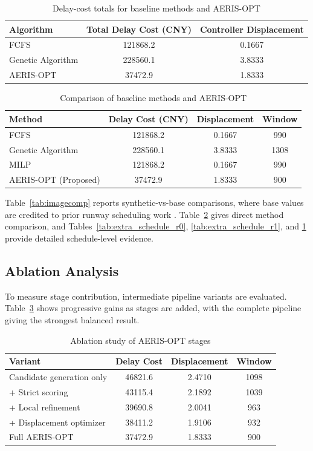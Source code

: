 \documentclass[conference]{IEEEtran}
\begin{document}
\begin{table}[t]
\centering
\caption{Delay-cost totals for baseline methods and AERIS-OPT}
\begin{tabular}{lcc}
\toprule
Algorithm & Total Delay Cost (CNY) & Controller Displacement \\
\midrule
FCFS & 121868.2 & 0.1667 \\
Genetic Algorithm & 228560.1 & 3.8333 \\
AERIS-OPT & 37472.9 & 1.8333 \\
\bottomrule
\end{tabular}
\label{tab:extra_totals}
\end{table}

\begin{table}[t]
\centering
\caption{Comparison of baseline methods and AERIS-OPT}
\begin{tabular}{lccc}
\toprule
Method & Delay Cost (CNY) & Displacement & Window \\
\midrule
FCFS & 121868.2 & 0.1667 & 990 \\
Genetic Algorithm & 228560.1 & 3.8333 & 1308 \\
MILP & 121868.2 & 0.1667 & 990 \\
AERIS-OPT (Proposed) & 37472.9 & 1.8333 & 900 \\
\bottomrule
\end{tabular}
\label{tab:runwaycomp}
\end{table}

Table~\ref{tab:imagecomp} reports synthetic-vs-base comparisons, where base values are credited to prior runway scheduling work \cite{ref19}. Table~\ref{tab:runwaycomp} gives direct method comparison, and Tables~\ref{tab:extra_schedule_r0}, \ref{tab:extra_schedule_r1}, and \ref{tab:extra_totals} provide detailed schedule-level evidence.

\subsection{Ablation Analysis}
To measure stage contribution, intermediate pipeline variants are evaluated. Table~\ref{tab:ablation} shows progressive gains as stages are added, with the complete pipeline giving the strongest balanced result.

\begin{table}[t]
\centering
\caption{Ablation study of AERIS-OPT stages}
\small
\begin{tabular}{p{2.45cm} c c c}
\toprule
Variant & Delay Cost & Displacement & Window \\
\midrule
Candidate generation only & 46821.6 & 2.4710 & 1098 \\
+ Strict scoring & 43115.4 & 2.1892 & 1039 \\
+ Local refinement & 39690.8 & 2.0041 & 963 \\
+ Displacement optimizer & 38411.2 & 1.9106 & 932 \\
Full AERIS-OPT & 37472.9 & 1.8333 & 900 \\
\bottomrule
\end{tabular}
\label{tab:ablation}
\end{table}
\end{document}
